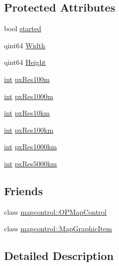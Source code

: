 \subsection*{Protected Attributes}
\begin{DoxyCompactItemize}
\item 
bool \hyperlink{group___o_p_map_widget_ga797e80c1349c656593de207aa74935de}{started}
\item 
qint64 \hyperlink{group___o_p_map_widget_ga3d5e76b481e1832dff58d33176b6a158}{Width}
\item 
qint64 \hyperlink{group___o_p_map_widget_ga9a5a3c48699aba8ef9582514fca243f0}{Height}
\item 
\hyperlink{ioapi_8h_a787fa3cf048117ba7123753c1e74fcd6}{int} \hyperlink{group___o_p_map_widget_ga0f93533bcdd67093c6da41e069997291}{px\-Res100m}
\item 
\hyperlink{ioapi_8h_a787fa3cf048117ba7123753c1e74fcd6}{int} \hyperlink{group___o_p_map_widget_gaa0947582a08d181d668db653fa4ed991}{px\-Res1000m}
\item 
\hyperlink{ioapi_8h_a787fa3cf048117ba7123753c1e74fcd6}{int} \hyperlink{group___o_p_map_widget_gaff97208acbd79e92f35d678a5651d063}{px\-Res10km}
\item 
\hyperlink{ioapi_8h_a787fa3cf048117ba7123753c1e74fcd6}{int} \hyperlink{group___o_p_map_widget_gab81b3e64348e0d02e67bd4f7350656cc}{px\-Res100km}
\item 
\hyperlink{ioapi_8h_a787fa3cf048117ba7123753c1e74fcd6}{int} \hyperlink{group___o_p_map_widget_ga5abde0bbaaa9517978da18398333e69b}{px\-Res1000km}
\item 
\hyperlink{ioapi_8h_a787fa3cf048117ba7123753c1e74fcd6}{int} \hyperlink{group___o_p_map_widget_gaed5c41c8c2b585074948d5918ae1a480}{px\-Res5000km}
\end{DoxyCompactItemize}
\subsection*{Friends}
\begin{DoxyCompactItemize}
\item 
class \hyperlink{group___o_p_map_widget_ga88abf786b489e97fc16ff6c07da3626e}{mapcontrol\-::\-O\-P\-Map\-Control}
\item 
class \hyperlink{group___o_p_map_widget_ga4fb537bcd209fc77cf5b8c9e38360c07}{mapcontrol\-::\-Map\-Graphic\-Item}
\end{DoxyCompactItemize}


\subsection{Detailed Description}


